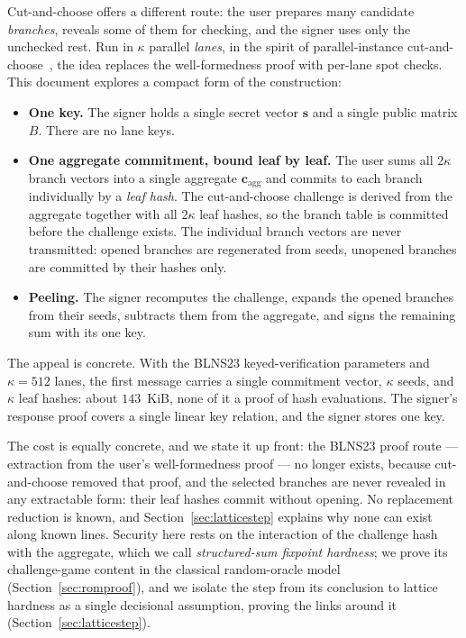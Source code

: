 \documentclass[11pt]{article}
\begin{document}
Cut-and-choose offers a different route: the user prepares many candidate
\emph{branches}, reveals some of them for checking, and the signer uses only
the unchecked rest.  Run in $\kappa$ parallel \emph{lanes}, in the spirit of
parallel-instance cut-and-choose~\cite{PCC22}, the idea replaces the
well-formedness proof with per-lane spot checks.  This document explores a
compact form of the construction:

\begin{itemize}
 \item \textbf{One key.}  The signer holds a single secret vector $\mathbf s$
and a single public matrix $B$.  There are no lane keys.
 \item \textbf{One aggregate commitment, bound leaf by leaf.}  The user sums
all $2\kappa$ branch vectors into a single aggregate $\mathbf
c_{\mathrm{agg}}$ and commits to each branch individually by a \emph{leaf
hash}.  The cut-and-choose challenge is derived from the aggregate together
with all $2\kappa$ leaf hashes, so the branch table is committed before the
challenge exists.  The individual branch vectors are never transmitted:
opened branches are regenerated from seeds, unopened branches are committed
by their hashes only.
 \item \textbf{Peeling.}  The signer recomputes the challenge, expands the
opened branches from their seeds, subtracts them from the aggregate, and signs
the remaining sum with its one key.
\end{itemize}

The appeal is concrete.  With the BLNS23 keyed-verification parameters and
$\kappa=512$ lanes, the first message carries a single commitment vector,
$\kappa$ seeds, and $\kappa$ leaf hashes: about $143$~KiB, none of it a proof
of hash evaluations.  The signer's response proof covers a single linear key
relation, and the signer stores one key.

The cost is equally concrete, and we state it up front: the BLNS23 proof
route --- extraction from the user's well-formedness proof --- no longer
exists, because cut-and-choose removed that proof, and the selected branches
are never revealed in any extractable form: their leaf hashes commit without
opening.  No replacement reduction is known, and
Section~\ref{sec:latticestep} explains why none can exist along known lines.
Security here rests on the interaction of the challenge hash with the
aggregate, which we call \emph{structured-sum fixpoint hardness}; we prove
its challenge-game content in the classical random-oracle model
(Section~\ref{sec:romproof}), and we isolate the step from its conclusion to
lattice hardness as a single decisional assumption, proving the links around
it (Section~\ref{sec:latticestep}).
\end{document}
